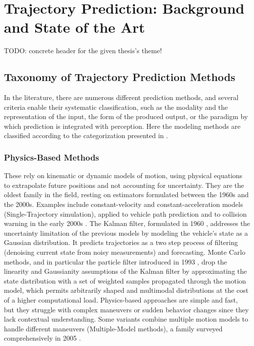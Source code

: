 \chapter{Trajectory Prediction: Background and State of the Art}
\label{chapter:sota}

TODO: concrete header for the given thesis's theme!


\section{Taxonomy of Trajectory Prediction Methods}
\label{sec:sota-taxonomy}

In the literature, there are numerous different prediction methods, and several criteria enable their
systematic classification, such as the modality and the representation of the input, the form of the
produced output, or the paradigm by which prediction is integrated with perception. Here the modeling
methods are classified according to the categorization presented in \cite{madjid2025survey}.

\subsection{Physics-Based Methods}
\label{subsec:sota-physics}

These rely on kinematic or dynamic models of motion, using physical equations to extrapolate
future positions and not accounting for uncertainty. They are the oldest family in the field, resting on
estimators formulated between the 1960s and the 2000s. Examples include constant-velocity and
constant-acceleration models (Single-Trajectory simulation), applied to vehicle path prediction and to
collision warning in the early 2000s \cite{Lin2000VehicleDynamics,Miller2002Collision}.
The Kalman filter, formulated in 1960 \cite{Kalman1960}, addresses the uncertainty limitation of the
previous models by modeling the vehicle's state as a Gaussian distribution. It predicts trajectories as a
two step process of filtering (denoising current state from noisy measurements) and forecasting. Monte Carlo
methods, and in particular the particle filter introduced in 1993 \cite{Gordon1993Bootstrap}, drop the
linearity and Gaussianity assumptions of the Kalman filter by approximating the state distribution with a
set of weighted samples propagated through the motion model, which permits arbitrarily shaped and multimodal
distributions at the cost of a higher computational load. Physics-based approaches are simple and fast,
but they struggle with complex maneuvers or sudden behavior changes since they lack contextual
understanding. Some variants combine multiple motion models to handle different maneuvers
(Multiple-Model methods), a family surveyed comprehensively in 2005 \cite{Li2005MultipleModel}.

